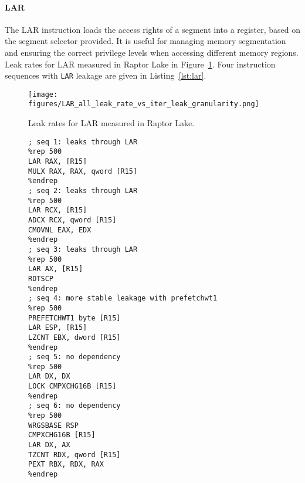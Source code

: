 \paragraph{LAR}
The LAR instruction loads the access rights of a segment into a register, based on the segment selector provided. It is useful for managing memory segmentation and ensuring the correct privilege levels when accessing different memory regions.
Leak rates for LAR measured in Raptor Lake in Figure~\ref{fig:larrrrr}. Four instruction sequences with \texttt{LAR} leakage are given in Listing~\ref{lst:lar}.

\begin{figure}
    \centering
    \texttt{[image: figures/LAR\_all\_leak\_rate\_vs\_iter\_leak\_granularity.png]}
    \caption{Leak rates for LAR measured in Raptor Lake.}
    \label{fig:larrrrr}
\end{figure}



\begin{figure}[h]
\begin{lstlisting}[caption=Four instruction sequences with \texttt{LAR} leakage, label={lst:lar}]
; seq 1: leaks through LAR
%rep 500
LAR RAX, [R15]
MULX RAX, RAX, qword [R15]
%endrep
; seq 2: leaks through LAR
%rep 500
LAR RCX, [R15]
ADCX RCX, qword [R15]
CMOVNL EAX, EDX
%endrep
; seq 3: leaks through LAR
%rep 500
LAR AX, [R15]
RDTSCP
%endrep
; seq 4: more stable leakage with prefetchwt1
%rep 500
PREFETCHWT1 byte [R15]
LAR ESP, [R15]
LZCNT EBX, dword [R15]
%endrep
; seq 5: no dependency
%rep 500
LAR DX, DX
LOCK CMPXCHG16B [R15]
%endrep
; seq 6: no dependency
%rep 500
WRGSBASE RSP
CMPXCHG16B [R15]
LAR DX, AX
TZCNT RDX, qword [R15]
PEXT RBX, RDX, RAX
%endrep
\end{lstlisting}
\end{figure}





